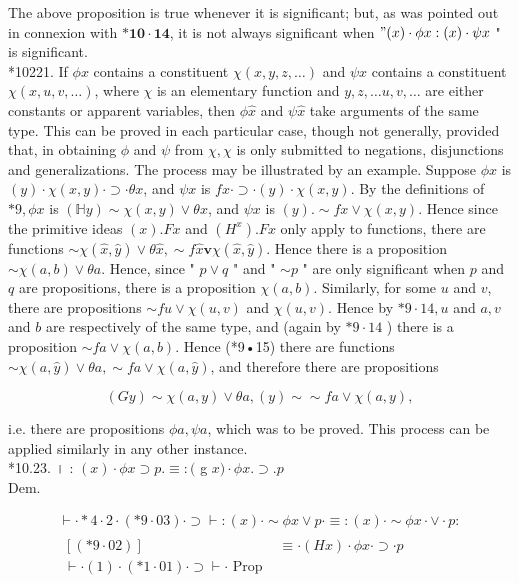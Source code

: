 \documentclass[10pt]{article}
\begin{document}
The above proposition is true whenever it is significant; but, as was pointed out in connexion with $\boldsymbol{*} \mathbf{1 0} \cdot \mathbf{1 4}$, it is not always significant when $"(x) \cdot \phi x:(x) \cdot \psi x$ " is significant.\\
*10221. If $\phi x$ contains a constituent $\chi(x, y, z, \ldots)$ and $\psi x$ contains a constituent $\chi(x, u, v, \ldots)$, where $\chi$ is an elementary function and $y, z, \ldots u, v, \ldots$ are either constants or apparent variables, then $\phi \hat{x}$ and $\psi \hat{x}$ take arguments of the same type. This can be proved in each particular case, though not generally, provided that, in obtaining $\phi$ and $\psi$ from $\chi, \chi$ is only submitted to negations, disjunctions and generalizations. The process may be illustrated by an example. Suppose $\phi x$ is $(y) \cdot \chi(x, y) \cdot \supset \cdot \theta x$, and $\psi x$ is $f x \cdot \supset \cdot(y) \cdot \chi(x, y)$. By the definitions of $* 9, \phi x$ is $(\mathbb{H} y) \sim \chi(x, y) \vee \theta x$, and $\psi x$ is $(y) . \sim f x \vee \chi(x, y)$. Hence since the primitive ideas $(x) . F x$ and $\left(H^{x}\right) . F x$ only apply to functions, there are functions $\sim \chi(\hat{x}, \hat{y}) \vee \theta \hat{x}, \sim f \hat{x} \mathbf{v} \chi(\hat{x}, \hat{y})$. Hence there is a proposition $\sim \chi(a, b) \vee \theta a$. Hence, since " $p \vee q$ " and " $\sim p$ " are only significant when $p$ and $q$ are propositions, there is a proposition $\chi(a, b)$. Similarly, for some $u$ and $v$, there are propositions $\sim f u \vee \chi(u, v)$ and $\chi(u, v)$. Hence by $* 9 \cdot 14, u$ and $a, v$ and $b$ are respectively of the same type, and (again by $* 9 \cdot 14$ ) there is a proposition $\sim f a \vee \chi(a, b)$. Hence (*9•15) there are functions $\sim \chi(a, \hat{y}) \vee \theta a, \sim f a \vee \chi(a, \hat{y})$, and therefore there are propositions

$$
(G y) \sim \chi(a, y) \vee \theta a,(y) \sim \sim f a \vee \chi(a, y),
$$

i.e. there are propositions $\phi a, \psi a$, which was to be proved. This process can be applied similarly in any other instance.\\
*10.23. । : $(x) \cdot \phi x \supset p . \equiv:($ g $x) \cdot \phi x . \supset . p$\\
Dem.

\[
\begin{array}{lr}
\vdash \cdot * 4 \cdot 2 \cdot(* 9 \cdot 03) \cdot \supset \vdash:(x) \cdot \sim \phi x \vee p \cdot \equiv:(x) \cdot \sim \phi x \cdot \vee \cdot p: \\
\begin{aligned}
{[(* 9 \cdot 02)] } & \equiv \cdot(H x) \cdot \phi x \cdot \supset \cdot p \\
\vdash \cdot(1) \cdot(* 1 \cdot 01) \cdot \supset \vdash \cdot \text { Prop } &
\end{aligned} \tag{1}
\end{array}
\]
\end{document}
